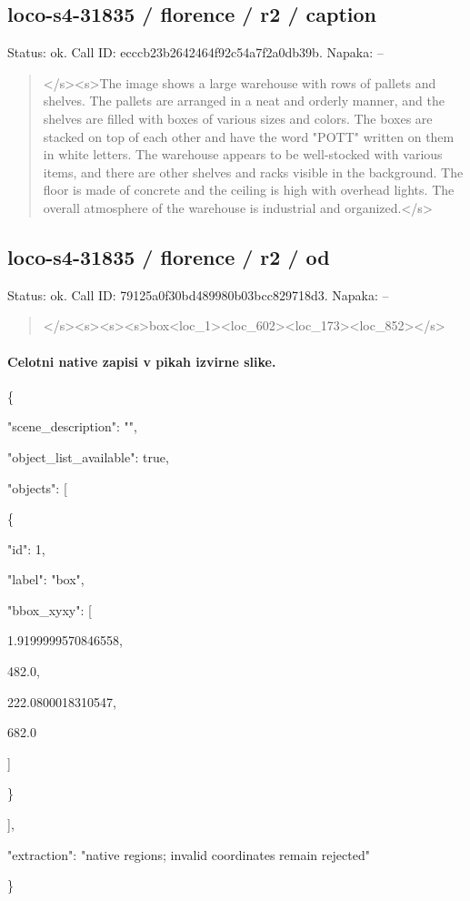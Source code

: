 \documentclass[10pt,a4paper]{article}
\begin{document}
\subsection*{loco-s4-31835 / florence / r2 / caption}
Status: ok. Call ID: ecccb23b2642464f92c54a7f2a0db39b. Napaka: --
\begin{quote}\footnotesize
</s>\allowbreak{}<s>\allowbreak{}The image shows a large warehouse with rows of pallets and shelves. The pallets are arranged in a neat and orderly manner,\allowbreak{} and the shelves are filled with boxes of various sizes and colors. The boxes are stacked on top of each other and have the word "POTT" written on them in white letters. The warehouse appears to be well-stocked with various items,\allowbreak{} and there are other shelves and racks visible in the background. The floor is made of concrete and the ceiling is high with overhead lights. The overall atmosphere of the warehouse is industrial and organized.</s>\allowbreak{}
\end{quote}
\subsection*{loco-s4-31835 / florence / r2 / od}
Status: ok. Call ID: 79125a0f30bd489980b03bcc829718d3. Napaka: --
\begin{quote}\footnotesize
</s>\allowbreak{}<s>\allowbreak{}<s>\allowbreak{}<s>\allowbreak{}box<loc\_1>\allowbreak{}<loc\_602>\allowbreak{}\allowbreak{}<loc\_173>\allowbreak{}<loc\_852>\allowbreak{}</s>\allowbreak{}
\end{quote}
\paragraph{Celotni native zapisi v pikah izvirne slike.}
\{\par
  "scene\_description":\allowbreak{} "",\allowbreak{}\par
  "object\_list\_available":\allowbreak{} true,\allowbreak{}\par
  "objects":\allowbreak{} [\par
    \{\par
      "id":\allowbreak{} 1,\allowbreak{}\par
      "label":\allowbreak{} "box",\allowbreak{}\par
      "bbox\_xyxy":\allowbreak{} [\par
        1.9199999570846558,\allowbreak{}\par
        482.0,\allowbreak{}\par
        222.0800018310547,\allowbreak{}\par
        682.0\par
      ]\par
    \}\par
  ],\allowbreak{}\par
  "extraction":\allowbreak{} "native regions; invalid coordinates remain rejected"\par
\}
\end{document}
